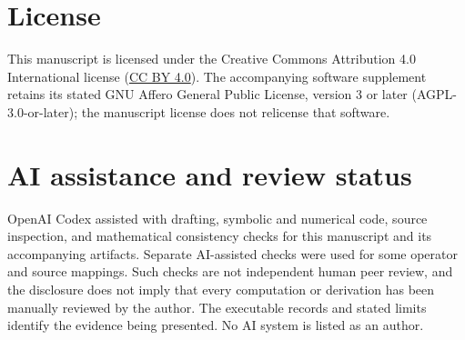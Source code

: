 \documentclass[11pt,letterpaper]{article}
\theoremstyle{definition}
\numberwithin{equation}{section}
\begin{document}
\section*{License}

This manuscript is licensed under the Creative Commons Attribution 4.0
International license (\href{https://creativecommons.org/licenses/by/4.0/}{CC BY 4.0}).
The accompanying software supplement retains its stated GNU Affero General
Public License, version 3 or later (AGPL-3.0-or-later); the manuscript
license does not relicense that software.

\section*{AI assistance and review status}

OpenAI Codex assisted with drafting, symbolic and numerical code, source
inspection, and mathematical consistency checks for this manuscript and
its accompanying artifacts. Separate AI-assisted checks were used for
some operator and source mappings. Such checks are not independent human
peer review, and the disclosure does not imply that every computation or
derivation has been manually reviewed by the author. The executable
records and stated limits identify the evidence being presented. No AI
system is listed as an author.
\end{document}
